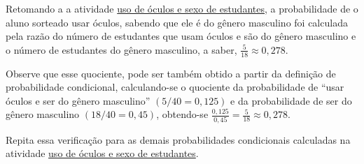Retomando a a atividade \hyperref[uso-oculos]{uso de óculos e sexo de estudantes}, a probabilidade de o aluno sorteado usar óculos, sabendo que ele é do gênero masculino foi calculada pela razão do número de estudantes que usam óculos e são do gênero masculino e o número de estudantes do gênero masculino, a saber, \(\frac{5}{18}\approx 0{,}278\).

Observe que esse quociente, pode ser também obtido a partir da definição de probabilidade condicional, calculando-se o quociente da probabilidade de “usar óculos e ser do gênero masculino”{} $(5/40=0{,}125)$ e da probabilidade de ser do gênero masculino $(18/40=0{,}45)$, obtendo-se \(\displaystyle{\frac{0,125}{0,45}=\frac{5}{18}\approx 0{,}278}\).

Repita essa verificação para as demais probabilidades condicionais calculadas na atividade \hyperref[uso-oculos]{uso de óculos e sexo de estudantes}.

